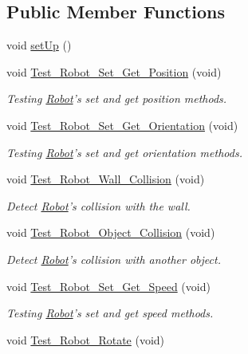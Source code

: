 \subsection*{Public Member Functions}
\begin{DoxyCompactItemize}
\item 
void \hyperlink{classUnitTests_a2e271564adb9ddc719c88cf16b5ea37a}{set\-Up} ()
\item 
void \hyperlink{classUnitTests_a5584f65afb7d741aa3992d56f851b567}{Test\-\_\-\-Robot\-\_\-\-Set\-\_\-\-Get\-\_\-\-Position} (void)
\begin{DoxyCompactList}\small\item\em Testing \hyperlink{classRobot}{Robot}'s set and get position methods. \end{DoxyCompactList}\item 
void \hyperlink{classUnitTests_a39b9ff1108db03e33133263f14d406fd}{Test\-\_\-\-Robot\-\_\-\-Set\-\_\-\-Get\-\_\-\-Orientation} (void)
\begin{DoxyCompactList}\small\item\em Testing \hyperlink{classRobot}{Robot}'s set and get orientation methods. \end{DoxyCompactList}\item 
void \hyperlink{classUnitTests_a7943e7bbe79bc83160dd27d63f7c04fb}{Test\-\_\-\-Robot\-\_\-\-Wall\-\_\-\-Collision} (void)
\begin{DoxyCompactList}\small\item\em Detect \hyperlink{classRobot}{Robot}'s collision with the wall. \end{DoxyCompactList}\item 
void \hyperlink{classUnitTests_ac3cc8df90c2fcf759aed342b5f693e3b}{Test\-\_\-\-Robot\-\_\-\-Object\-\_\-\-Collision} (void)
\begin{DoxyCompactList}\small\item\em Detect \hyperlink{classRobot}{Robot}'s collision with another object. \end{DoxyCompactList}\item 
void \hyperlink{classUnitTests_aaa2c85e9d9302379dada10b0f9d6a113}{Test\-\_\-\-Robot\-\_\-\-Set\-\_\-\-Get\-\_\-\-Speed} (void)
\begin{DoxyCompactList}\small\item\em Testing \hyperlink{classRobot}{Robot}'s set and get speed methods. \end{DoxyCompactList}\item 
void \hyperlink{classUnitTests_aca55268139a4e613f404875de7c2c51e}{Test\-\_\-\-Robot\-\_\-\-Rotate} (void)

\end{DoxyCompactItemize}
